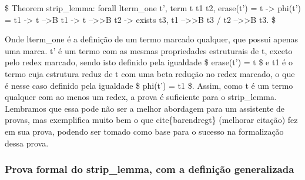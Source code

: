  \$ Theorem strip\_lemma: forall  lterm\_one t', term t t1 t2, erase(t') = t -> phi(t') = t1 ->
t -->B t1 -> t -->>B t2 -> exists t3, t1 -->>B t3 / t2 -->>B t3. \$ 

 Onde lterm\_one é a definição de um termo marcado qualquer, que possui apenas uma marca. t' é um termo com as mesmas propriedades
estruturais de t, exceto pelo redex marcado, sendo isto definido pela igualdade \$ erase(t') = t \$ e t1 é o termo cuja estrutura
reduz de t com uma beta redução no redex marcado, o que é nesse caso definido pela igualdade \$ phi(t') = t1 \$. Assim, como t é um
termo qualquer com ao menos um redex, a prova é suficiente para o strip\_lemma. Lembramos que essa pode não ser a melhor abordagem para
um assistente de provas, mas exemplifica muito bem o que cite\{barendregt\} (melhorar citação) fez em sua prova, podendo ser tomado como base para o sucesso
na formalização dessa prova. 

\subsubsection{Prova formal do strip\_lemma, com a definição generalizada}

